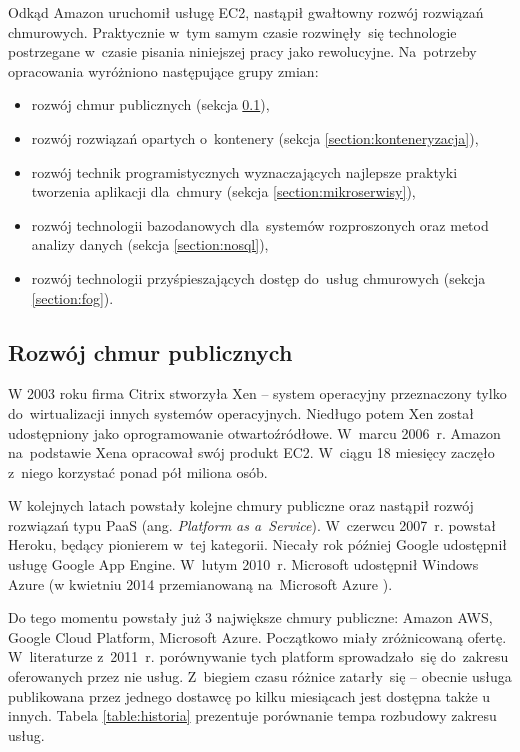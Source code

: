 \documentclass[12pt,a4paper,twoside,titlepage,openright]{book}
\begin{document}
Odkąd Amazon uruchomił usługę EC2, nastąpił gwałtowny rozwój rozwiązań chmurowych. Praktycznie w~tym samym czasie rozwinęły~się technologie postrzegane w~czasie pisania niniejszej pracy jako rewolucyjne. Na~potrzeby opracowania wyróżniono następujące grupy zmian:
\begin{itemize}
\item rozwój chmur publicznych (sekcja \ref{section:chmuryPubliczne}),
\item rozwój rozwiązań opartych o~kontenery (sekcja \ref{section:konteneryzacja}),
\item rozwój technik programistycznych wyznaczających najlepsze praktyki tworzenia aplikacji dla~chmury (sekcja \ref{section:mikroserwisy}),
\item rozwój technologii bazodanowych dla~systemów rozproszonych oraz metod analizy danych (sekcja \ref{section:nosql}),
\item rozwój technologii przyśpieszających dostęp do~usług chmurowych (sekcja \ref{section:fog}).
\end{itemize}

\subsection{Rozwój chmur publicznych} \label{section:chmuryPubliczne}

W 2003 roku firma Citrix stworzyła Xen -- system operacyjny przeznaczony tylko do~wirtualizacji innych systemów operacyjnych. Niedługo potem Xen został udostępniony jako oprogramowanie otwartoźródłowe. W~marcu 2006~r. Amazon na~podstawie Xena opracował swój produkt EC2. W~ciągu 18 miesięcy zaczęło z~niego korzystać ponad pół miliona osób.\cite{ccBiznes}

W kolejnych latach powstały kolejne chmury publiczne oraz nastąpił rozwój rozwiązań typu PaaS (ang. \textit{Platform as a~Service}). W~czerwcu 2007~r. powstał Heroku, będący pionierem w~tej kategorii. Niecały rok później Google udostępnił usługę Google App Engine. W~lutym 2010~r. Microsoft udostępnił Windows Azure (w kwietniu 2014 przemianowaną na~Microsoft Azure \cite{azurePackt}).

Do tego momentu powstały już 3 największe chmury publiczne: Amazon AWS, Google Cloud Platform, Microsoft Azure. Początkowo miały zróżnicowaną ofertę. W~literaturze\cite{ccBiznes} z~2011~r. porównywanie tych platform sprowadzało~się do~zakresu oferowanych przez nie usług. Z~biegiem czasu różnice zatarły~się -- obecnie usługa publikowana przez jednego dostawcę po kilku miesiącach jest dostępna także u innych. Tabela \ref{table:historia} prezentuje porównanie tempa rozbudowy zakresu usług.
\end{document}
